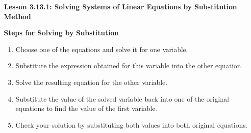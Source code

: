   \begin{center}
\textbf{Lesson 3.13.1: Solving Systems of Linear Equations by Substitution Method}
\end{center}

\vspace*{1ex}

\noindent\textbf{Steps for Solving by Substitution}

\begin{enumerate}
    \item Choose one of the equations and solve it for one variable.
    \item Substitute the expression obtained for this variable into the other equation.
    \item Solve the resulting equation for the other variable.
    \item Substitute the value of the solved variable back into one of the original equations to find the value of the first variable.
    \item Check your solution by substituting both values into both original equations.
\end{enumerate}



